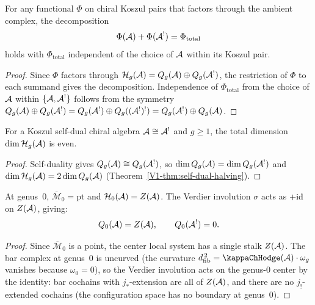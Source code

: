 \begin{corollary}
For any functional $\Phi$ on chiral Koszul pairs that
factors through the ambient complex, the decomposition
\[
\Phi(\mathcal{A}) + \Phi(\mathcal{A}^!) = \Phi_{\mathrm{total}}
\]
holds with $\Phi_{\mathrm{total}}$ independent of the choice
of $\mathcal{A}$ within its Koszul pair.
\end{corollary}

\begin{proof}
Since $\Phi$ factors through
$\mathcal{H}_g(\mathcal{A}) = Q_g(\mathcal{A}) \oplus Q_g(\mathcal{A}^!)$,
the restriction of $\Phi$ to each summand gives the
decomposition. Independence of $\Phi_{\mathrm{total}}$
from the choice of $\mathcal{A}$ within $\{\mathcal{A}, \mathcal{A}^!\}$
follows from the symmetry $Q_g(\mathcal{A}) \oplus Q_g(\mathcal{A}^!)
= Q_g(\mathcal{A}^!) \oplus Q_g((\mathcal{A}^!)^!) = Q_g(\mathcal{A}^!) \oplus Q_g(\mathcal{A})$.
\end{proof}

\begin{corollary}
For a Koszul self-dual chiral algebra $\mathcal{A} \cong \mathcal{A}^!$ and
$g \ge 1$, the total dimension
$\dim \mathcal{H}_g(\mathcal{A})$ is even.
\end{corollary}

\begin{proof}
Self-duality gives $Q_g(\mathcal{A}) \cong Q_g(\mathcal{A}^!)$, so
$\dim Q_g(\mathcal{A}) = \dim Q_g(\mathcal{A}^!)$ and
$\dim \mathcal{H}_g(\mathcal{A})
= 2 \dim Q_g(\mathcal{A})$
(Theorem~\ref{V1-thm:self-dual-halving}).
\end{proof}

\begin{proposition}
At genus~$0$, $\overline{\mathcal{M}}_0 = \mathrm{pt}$ and
$\mathcal{H}_0(\mathcal{A}) = Z(\mathcal{A})$.
The Verdier involution $\sigma$ acts as $+\mathrm{id}$ on $Z(\mathcal{A})$,
giving:
\[
Q_0(\mathcal{A}) = Z(\mathcal{A}), \qquad Q_0(\mathcal{A}^!) = 0.
\]
\end{proposition}

\begin{proof}
Since $\overline{\mathcal{M}}_0$ is a point, the center
local system has a single stalk $Z(\mathcal{A})$. The bar complex
at genus~$0$ is uncurved (the curvature
$\dfib^{\,2} = \kappaChHodge(\cA) \cdot \omega_g$ vanishes
because $\omega_0 = 0$), so the Verdier involution acts on
the genus-$0$ center by the identity: bar cochains with
$j_*$-extension are all of $Z(\mathcal{A})$, and there are no
$j_!$-extended cochains (the configuration space has no
boundary at genus~$0$).
\end{proof}

